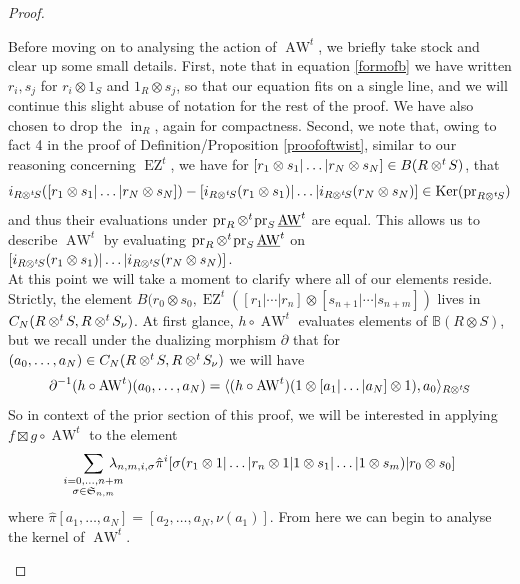 \documentclass{article}
\makeatletter
\newcommand{\ten}{\otimes}
\newcommand{\twisten}{\otimes^t\hspace{-1pt}}
\newcommand{\awt}{\operatorname{AW}^t}
\newcommand{\ezt}{\operatorname{EZ}^t}
\newcommand{\pr}{\operatorname{pr}}
\newcommand{\inc}{\operatorname{in}}
\newcommand{\elr}{[r_1 | \cdots | r_n]}
\newcommand{\els}{[s_{n+1} | \cdots |s_{n+m}]}
\newcommand{\bawt}{\underline{\operatorname{AW}}^t}
\theoremstyle{plain}
\theoremstyle{definition}
\def\namedlabel#1#2{\begingroup
    #2%
    \def\@currentlabel{#2}%
    \phantomsection\label{#1}\endgroup 
}
\makeatother
\begin{document}
\begin{proof}
\begin{pfparts}
 \item[\namedlabel{pfpart:elemenetdiscussion}{A Brief Discussion on Elements.}]
Before moving on to analysing the action of $\awt$, we briefly take stock and clear up some small details. First, note that in equation \ref{formofb} we have written $r_i, s_j$ for $r_i \otimes 1_S$ and $1_R \otimes s_j$, so that our equation fits on a single line, and we will continue this slight abuse of notation for the rest of the proof. We have also chosen to drop the $\inc_R$, again for compactness. Second, we note that, owing to fact 4 in the proof of Definition/Proposition \ref{proofoftwist}, similar to our reasoning concerning $\ezt$, we have for $[r_1 \otimes s_1 | \ldots | r_N \otimes s_N ] \in B(R \twisten S)$, that 
$$i_{R \twisten S}([r_1 \otimes s_1 | \ldots | r_N \otimes s_N ]) - [i_{R \twisten S}(r_1 \otimes s_1) | \ldots | i_{R \twisten S}(r_N \otimes s_N)] \in \operatorname{Ker}(\pr_{R \twisten S})$$
and thus their evaluations under $\pr_{R} \twisten \pr_S \bawt$ are equal. This allows us to describe $\awt$ by evaluating $\pr_R \twisten \pr_S \bawt$ on $[i_{R \twisten S}(r_1 \otimes s_1) | \ldots | i_{R \twisten S}(r_N \otimes s_N)]$. \\
At this point we will take a moment to clarify where all of our elements reside. Strictly, the element $B(r_0 \otimes s_0, \ezt (\elr \ten \els)$ lives in $C_{N}(R \twisten S, R \twisten S_\nu)$. At first glance, $h \circ \awt$ evaluates elements of $\mathbb{B}(R \otimes S)$, but we recall under the dualizing morphism $\partial$ that for $(a_0, \ldots, a_{N}) \in C_{N}(R \twisten S, R \twisten S_\nu)$ we will have
$$ \partial^{-1}(h \circ \awt) (a_0 , \ldots , a_{N}) = \langle (h \circ \awt)(1 \otimes [a_1 | \ldots | a_{N}] \otimes 1) , a_0\rangle_{R \twisten S}$$
So in context of the prior section of this proof, we will be interested in applying $f \boxtimes g \circ \awt$ to the element
\begin{equation*}\sum_{\substack{i=0, \ldots, n+m  \\ \sigma \in \mathfrak{S}_{n,m}}}\hspace{-12pt}\lambda_{n,m, i,  \sigma}\hat{\pi}^i[\sigma (r_1 \otimes 1 |\ldots | r_n \otimes 1 | 1 \otimes  s_1 | \ldots | 1 \otimes s_m) | r_0 \otimes s_0]\end{equation*}
where $\hat{\pi}[a_1, \ldots, a_{N}] = [a_{2}, \ldots, a_{N}, \nu(a_1)]$. From here we can begin to analyse the kernel of $\awt$.


\end{pfparts}
\end{proof}
\end{document}
